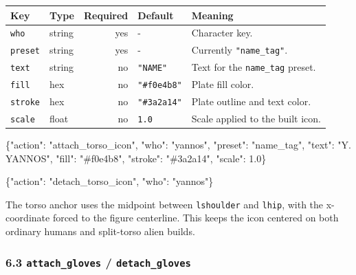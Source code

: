\documentclass[
  11pt,
]{book}
\newenvironment{Shaded}{}{}
\newcommand{\DataTypeTok}[1]{\textcolor[rgb]{0.56,0.13,0.00}{#1}}
\newcommand{\FloatTok}[1]{\textcolor[rgb]{0.25,0.63,0.44}{#1}}
\newcommand{\FunctionTok}[1]{\textcolor[rgb]{0.02,0.16,0.49}{#1}}
\newcommand{\StringTok}[1]{\textcolor[rgb]{0.25,0.44,0.63}{#1}}
\begin{document}
\begin{longtable}[]{@{}llrll@{}}
\toprule\noalign{}
Key & Type & Required & Default & Meaning \\
\midrule\noalign{}
\endhead
\bottomrule\noalign{}
\endlastfoot
\texttt{who} & string & yes & - & Character key. \\
\texttt{preset} & string & yes & - & Currently \texttt{"name\_tag"}. \\
\texttt{text} & string & no & \texttt{"NAME"} & Text for the
\texttt{name\_tag} preset. \\
\texttt{fill} & hex & no & \texttt{"\#f0e4b8"} & Plate fill color. \\
\texttt{stroke} & hex & no & \texttt{"\#3a2a14"} & Plate outline and
text color. \\
\texttt{scale} & float & no & \texttt{1.0} & Scale applied to the built
icon. \\
\end{longtable}

\begin{Shaded}
\begin{Highlighting}[]
\FunctionTok{\{}\DataTypeTok{"action"}\FunctionTok{:} \StringTok{"attach\_torso\_icon"}\FunctionTok{,} \DataTypeTok{"who"}\FunctionTok{:} \StringTok{"yannos"}\FunctionTok{,}
 \DataTypeTok{"preset"}\FunctionTok{:} \StringTok{"name\_tag"}\FunctionTok{,} \DataTypeTok{"text"}\FunctionTok{:} \StringTok{"Y. YANNOS"}\FunctionTok{,}
 \DataTypeTok{"fill"}\FunctionTok{:} \StringTok{"\#f0e4b8"}\FunctionTok{,} \DataTypeTok{"stroke"}\FunctionTok{:} \StringTok{"\#3a2a14"}\FunctionTok{,} \DataTypeTok{"scale"}\FunctionTok{:} \FloatTok{1.0}\FunctionTok{\}}
\end{Highlighting}
\end{Shaded}

\begin{Shaded}
\begin{Highlighting}[]
\FunctionTok{\{}\DataTypeTok{"action"}\FunctionTok{:} \StringTok{"detach\_torso\_icon"}\FunctionTok{,} \DataTypeTok{"who"}\FunctionTok{:} \StringTok{"yannos"}\FunctionTok{\}}
\end{Highlighting}
\end{Shaded}

The torso anchor uses the midpoint between \texttt{lshoulder} and
\texttt{lhip}, with the x-coordinate forced to the figure centerline.
This keeps the icon centered on both ordinary humans and split-torso
alien builds.

\subsubsection{\texorpdfstring{6.3 \texttt{attach\_gloves} /
\texttt{detach\_gloves}}{6.3 attach\_gloves / detach\_gloves}}\label{attach_gloves-detach_gloves}
\end{document}
